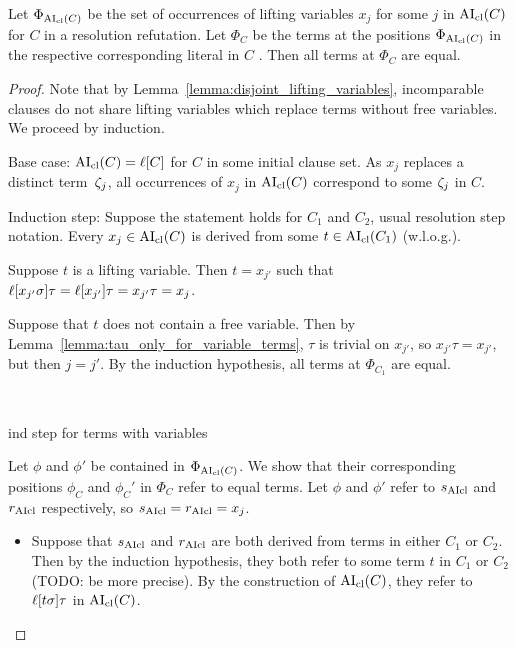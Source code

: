 \documentclass[,%
	paper=a4,%
	DIV14, 
	liststotoc,
	bibtotoc,
	draft=false,%
	numbers=noendperiod
]{scrartcl}
\begin{document}
\begin{lemma}
	Let $\Phi_{\operatorname{AI}_\mathrm{cl}(C)}$ be the set of occurrences of lifting variables $x_j$ for some $j$ in $\operatorname{AI}_\mathrm{cl}(C)$ for $C$ in a resolution refutation.
	Let $\Phi_{C}$ be the terms at the positions $\Phi_{\operatorname{AI}_\mathrm{cl}(C)}$ in the respective corresponding literal in $C$ .
	Then all terms at $\Phi_C$ are equal.
\end{lemma}
\begin{proof}
	Note that by Lemma~\ref{lemma:disjoint_lifting_variables}, incomparable clauses do not share lifting variables which replace terms without free variables. 
	We proceed by induction.

	Base case: $\operatorname{AI}_\mathrm{cl}(C) = \ell[C]$ for $C$ in some initial clause set.
	As $x_j$ replaces a distinct term~$\zeta_{j}$, all occurrences of $x_j$ in $\operatorname{AI}_\mathrm{cl}(C)$ correspond to some $\zeta_{j}$ in $C$.

	Induction step:
	Suppose the statement holds for $C_1$ and $C_2$, usual resolution step notation.
	Every $x_j \in \operatorname{AI}_\mathrm{cl}(C)$ is derived from some $t \in \operatorname{AI}_\mathrm{cl}(C_1)$ (w.l.o.g.).
	\begin{compactitem}
	\item
		Suppose $t$ is a lifting variable.
		Then $t = x_{j'}$ such that $\lifboth{x_{j'}\sigma}\tau = \lifboth{x_{j'}}\tau = x_{j'}\tau =\nolinebreak x_j$.

		Suppose that $t$ does not contain a free variable.
		Then by Lemma~\ref{lemma:tau_only_for_variable_terms}, $\tau$ is trivial on $x_{j'}$, so $x_{j'}\tau = x_{j'}$, but then $j=j'$.
		By the induction hypothesis, all terms at $\Phi_{C_1}$ are equal.
	\end{compactitem}

	\bigskip

	~
	\bigskip

	ind step for terms with variables


	Let $\phi$ and $\phi'$ be contained in $\Phi_{\operatorname{AI}_\mathrm{cl}(C)}$. We show that their corresponding positions $\phi_C$ and $\phi_C'$ in $\Phi_C$ refer to equal terms.
	Let $\phi$ and $\phi'$ refer to $s_{\operatorname{AIcl}}$ and $r_{\operatorname{AIcl}}$ respectively, so $s_{\operatorname{AIcl}} = r_{\operatorname{AIcl}} = x_j$.
	\begin{itemize}
		\item Suppose that $s_{\operatorname{AIcl}}$ and $r_{\operatorname{AIcl}}$ are both derived from terms in either $C_1$ or $C_2$.
			Then by the induction hypothesis, they both refer to some term $t$ in $C_1$ or $C_2$ (TODO: be more precise).
			By the construction of $\operatorname{AI}_\mathrm{cl}(C)$, they refer to $\ell[t\sigma]\tau$ in $\operatorname{AI}_\mathrm{cl}(C)$.


\end{itemize}
\end{proof}
\end{document}
